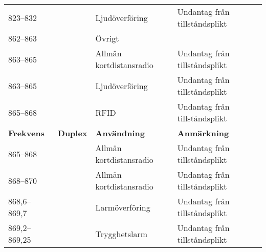 \documentclass[10pt,swedish,a4paper,twoside]{article}
\begin{document}
\begin{landscape}
\begin{longtable}{llll}
	823--832           &                    & Ljudöverföring                 & Undantag från tillståndsplikt       \\
	862--863           &                    & Övrigt                         &  \\
	863--865           &                    & Allmän kortdistansradio        & Undantag från tillståndsplikt       \\
	863--865           &                    & Ljudöverföring                 & Undantag från tillståndsplikt       \\
	865--868           &                    & RFID                           & Undantag från tillståndsplikt       \\
	\textbf{Frekvens}  & \textbf{Duplex}    & \textbf{Användning}            & \textbf{Anmärkning}                 \\ \hline

	865--868           &                    & Allmän kortdistansradio        & Undantag från tillståndsplikt       \\
	868--870           &                    & Allmän kortdistansradio        & Undantag från tillståndsplikt       \\
	868,6--869,7       &                    & Larmöverföring                 & Undantag från tillståndsplikt       \\
	869,2--869,25      &                    & Trygghetslarm                  & Undantag från tillståndsplikt
\end{longtable}

\end{landscape}
\end{document}
